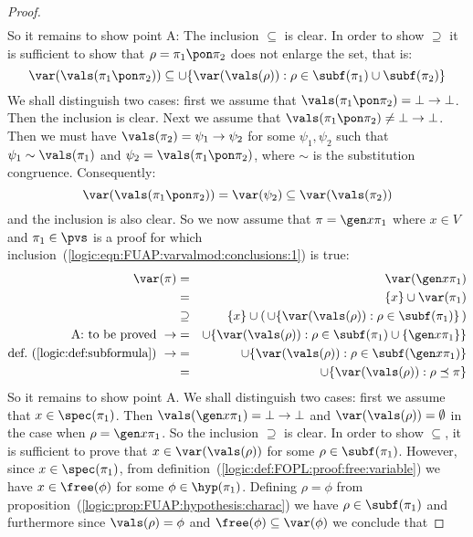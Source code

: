 \begin{proof}
\begin{eqnarray*}
    \end{eqnarray*}
So it remains to show point A: The inclusion $\subseteq$ is clear.
In order to show $\supseteq$ it is sufficient to show that
$\rho=\pi_{1}\pon\pi_{2}$ does not enlarge the set, that is:
    \[
    \var(\vals(\pi_{1}\pon\pi_{2}))\subseteq
    \cup\{\var(\vals(\rho)):\rho\in\subf(\pi_{1})\cup\subf(\pi_{2})\}
    \]
We shall distinguish two cases: first we assume that
$\vals(\pi_{1}\pon\pi_{2})=\bot\to\bot$. Then the inclusion is
clear. Next we assume that
$\vals(\pi_{1}\pon\pi_{2})\neq\bot\to\bot$. Then we must have
$\vals(\pi_{2})=\psi_{1}\to\psi_{2}$ for some $\psi_{1},\psi_{2}$
such that $\psi_{1}\sim\vals(\pi_{1})$ and
$\psi_{2}=\vals(\pi_{1}\pon\pi_{2})$, where $\sim$ is the
substitution congruence. Consequently:
    \[
    \var(\vals(\pi_{1}\pon\pi_{2}))=\var(\psi_{2})\subseteq\var(\vals(\pi_{2}))
    \]
and the inclusion is also clear. So we now assume that $\pi=\gen
x\pi_{1}$ where $x\in V$ and $\pi_{1}\in\pvs$ is a proof for which
inclusion~(\ref{logic:eqn:FUAP:varvalmod:conclusions:1}) is true:
    \begin{eqnarray*}
    \var(\pi)&=&\var(\gen x\pi_{1})\\
    &=&\{x\}\cup\var(\pi_{1})\\
    &\supseteq&\{x\}\cup(\,\cup\{\var(\vals(\rho)):\rho\in\subf(\pi_{1})\}\,)\\
    \mbox{A: to be proved}\ \rightarrow&=&
    \cup\{\var(\vals(\rho)):\rho\in\subf(\pi_{1})\cup\{\gen x\pi_{1}\}\}\\
    \mbox{def.~(\ref{logic:def:subformula})}\ \rightarrow
    &=&\cup\{\var(\vals(\rho)):\rho\in\subf(\gen x\pi_{1})\}\\
    &=&\cup\{\var(\vals(\rho)):\rho\preceq\pi\}\\
    \end{eqnarray*}
So it remains to show point A. We shall distinguish two cases: first
we assume that $x\in\spec(\pi_{1})$. Then $\vals(\gen
x\pi_{1})=\bot\to\bot$ and $\var(\vals(\rho))=\emptyset$ in the case
when $\rho=\gen x\pi_{1}$. So the inclusion $\supseteq$ is clear. In
order to show $\subseteq$, it is sufficient to prove that
$x\in\var(\vals(\rho))$ for some $\rho\in\subf(\pi_{1})$. However,
since $x\in\spec(\pi_{1})$, from
definition~(\ref{logic:def:FOPL:proof:free:variable}) we have
$x\in\free(\phi)$ for some $\phi\in\hyp(\pi_{1})$. Defining
$\rho=\phi$ from
proposition~(\ref{logic:prop:FUAP:hypothesis:charac}) we have
$\rho\in\subf(\pi_{1})$ and furthermore since $\vals(\rho)=\phi$ and
$\free(\phi)\subseteq\var(\phi)$ we conclude that

\end{proof}
